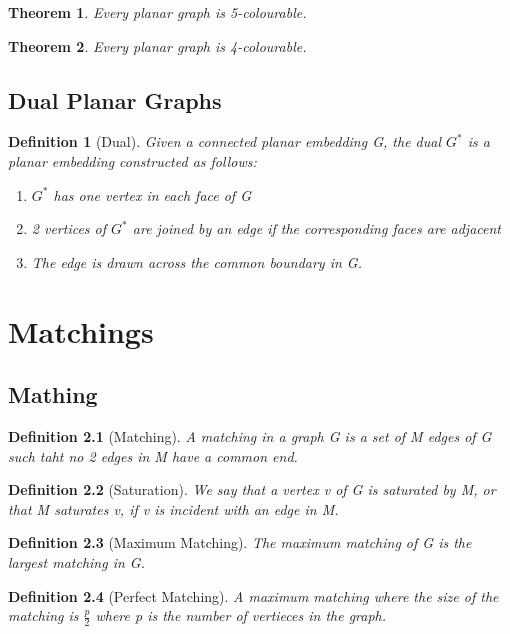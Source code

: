 \documentclass[11pt, oneside]{book}
\theoremstyle{break}
\newtheorem{thm}{Theorem}[section]
\newtheorem{defn}{Definition}[section]
\begin{document}
\begin{thm}
	Every planar graph is 5-colourable.
\end{thm}

\begin{thm}
	Every planar graph is 4-colourable.
\end{thm}


\section{Dual Planar Graphs}

\begin{defn}[Dual]
	Given a connected planar embedding G, the dual $G^*$ is a planar embedding constructed as follows:\\
	\begin{enumerate}
		\item $G^*$ has one vertex in each face of G
		\item 2 vertices of $G^*$ are joined by an edge if the corresponding faces are adjacent
		\item The edge is drawn across the common boundary in G.
	\end{enumerate}
\end{defn}



\chapter{Matchings}

\section{Mathing}

\begin{defn}[Matching]
	A matching in a graph G is a set of M edges of G such taht no 2 edges in M have a common end.
\end{defn}

\begin{defn}[Saturation]
	We say that a vertex v of G is saturated by M, or that M saturates v, if v is incident with an edge in M.
\end{defn}

\begin{defn}[Maximum Matching]
	The maximum matching of G is the largest matching in G.
\end{defn}

\begin{defn}[Perfect Matching]
	A maximum matching where the size of the matching is $\frac{p}{2}$ where p is the number of vertieces in the graph.
\end{defn}
\end{document}
